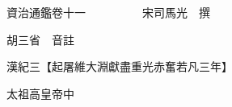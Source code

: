 










 


 
 


 

  
  
  
  
  





  
  
  
  
  
 
  

  

  
  
  



  

 
 

  
   




  

  
  


  　　資治通鑑卷十一　　　　　宋司馬光　撰

　　胡三省　音註

　　漢紀三【起屠維大淵獻盡重光赤奮若凡三年】

　　太祖高皇帝中

